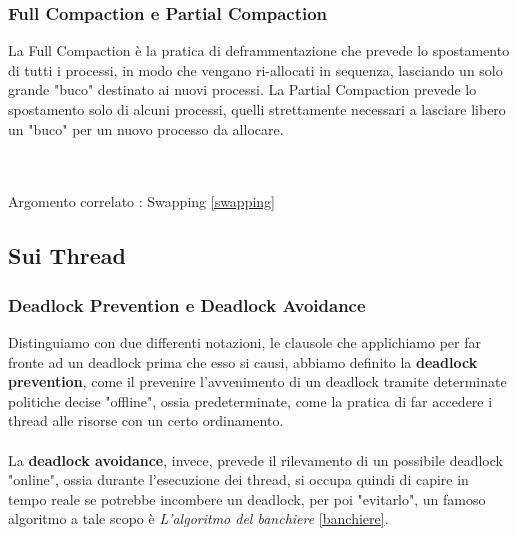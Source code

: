 \documentclass[12pt, letterpaper]{article}
\newcommand{\acc}{\\\hphantom{}\\}
\begin{document}
\subsubsection{Full Compaction e Partial Compaction }\label{Compaction}
La Full Compaction è la pratica di deframmentazione che prevede lo spostamento di tutti i processi, in modo che vengano 
ri-allocati in sequenza, lasciando un solo grande "buco" destinato ai nuovi processi. La Partial Compaction prevede 
lo spostamento solo di alcuni processi, quelli strettamente necessari a lasciare libero un "buco" per un nuovo processo 
da allocare.\\
\begin{figure}[h]
\end{figure}
\acc
Argomento correlato : Swapping \ref{swapping}
\subsection{Sui Thread}
\subsubsection{Deadlock Prevention e Deadlock Avoidance}\label{DeadLockPrev&Avoid}
Distinguiamo con due differenti notazioni, le clausole che applichiamo per far fronte ad un deadlock 
prima che esso si causi, abbiamo definito la \textbf{deadlock prevention}, come il prevenire 
l'avvenimento di un deadlock tramite determinate politiche decise "offline", ossia predeterminate, come la pratica di far 
accedere i thread alle risorse con un certo ordinamento.\acc La \textbf{deadlock avoidance}, invece, 
prevede il rilevamento di un possibile deadlock "online", ossia durante l'esecuzione dei thread, si occupa 
quindi di capire in tempo reale se potrebbe incombere un deadlock, per poi "evitarlo", un famoso algoritmo 
a tale scopo è \textit{L'algoritmo del banchiere} \ref{banchiere}.
\end{document}
